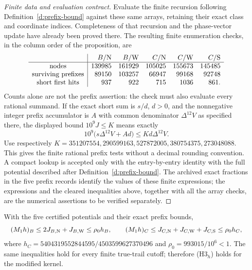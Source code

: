 \begin{proof}[Finite data and evaluation contract]
Evaluate the finite recursion following
Definition~\ref{d:prefix-bound} against these same arrays, retaining
their exact class and coordinate indices. Completeness of that
recursion and the phase-vector update have already been proved
there. The resulting finite enumeration checks, in the column
order of the proposition, are
\[
 \begin{array}{c|rrrrr}
 &B/{\rm N}&B/{\rm W}&C/{\rm N}&C/{\rm W}&C/{\rm S}\\ \hline
 \text{nodes}&139985&161929&105025&155673&145485\\
 \text{surviving prefixes}&89150&103257&66947&99168&92748\\
 \text{short first hits}&937&922&715&1036&861.
 \end{array}
\]
Counts alone are not the prefix assertion: the check must also
evaluate every rational summand. If the exact short sum is
\(s/d\), \(d>0\), and the nonnegative integer prefix accumulator
is \(A\) with common denominator \(\Delta^{12}V\) as specified
there, the displayed bound \(10^9J\le K\) means exactly
\[
 10^9\bigl(s\Delta^{12}V+Ad\bigr)
                  \le Kd\Delta^{12}V .
\]
Use respectively
\(K=351207554,290599163,527872005,380754375,273048088\).
This gives the finite rational prefix tests without a decimal
rounding convention. A compact lookup is accepted only with the
entry-by-entry identity with the full potential described after
Definition~\ref{d:prefix-bound}.
The archived exact fractions in the five prefix records identify
the values of these finite expressions; the expressions and the
cleared inequalities above, together with all the array checks,
are the numerical assertions to be verified separately.
\end{proof}

\begin{lemma}\label{l:stationary-assembly}
With the five certified potentials and their exact prefix bounds,
\[
 (M_1h)_B\le2J_{B,{\rm N}}+J_{B,{\rm W}}\le\rho_0h_B,\qquad
 (M_1h)_C\le J_{C,{\rm N}}+J_{C,{\rm W}}+J_{C,{\rm S}}
                                      \le\rho_0h_C ,
\]
where \(h_C=5404319552844595/4503599627370496\) and
\(\rho_0=993015/10^6<1\).
The same inequalities hold for every finite true-trail cutoff;
therefore (H3\(_h\)) holds for the modified kernel.
\end{lemma}

